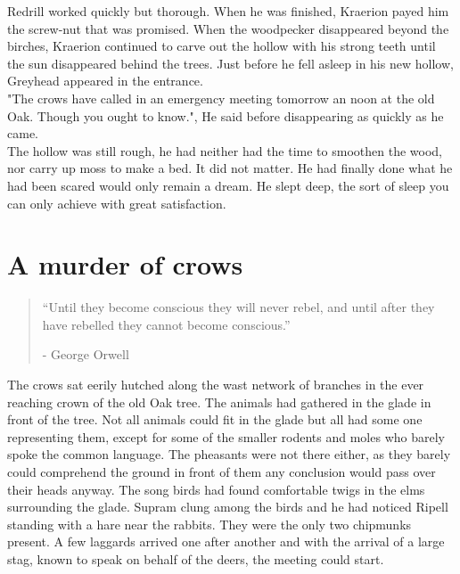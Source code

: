\documentclass[smalldemyvopaper,11pt,twoside,onecolumn,openright,extrafontsizes]{memoir}
\begin{document}
Redrill worked quickly but thorough. When he was finished, Kraerion payed him the screw-nut that was promised. When the woodpecker disappeared beyond the birches, Kraerion continued to carve out the hollow with his strong teeth until the sun disappeared behind the trees. Just before he fell asleep in his new hollow, Greyhead appeared in the entrance. \\

"The crows have called in an emergency meeting tomorrow an noon at the old Oak. Though you ought to know.", He said before disappearing as quickly as he came.\\

The hollow was still rough, he had neither had the time to smoothen the wood, nor carry up moss to make a bed. It did not matter. He had finally done what he had been scared would only remain a dream. He slept deep, the sort of sleep you can only achieve with great satisfaction.  

\chapter{A murder of crows}

\vspace{-1.3cm}
\begin{localsize}{10}
	\begin{quote}
		 “Until they become conscious they will never rebel, and until after they have rebelled they cannot become conscious.” 
		\begin{flushright}- George Orwell \end{flushright}
	\end{quote} 
\end{localsize}
\vspace{1cm}

The crows sat eerily hutched along the wast network of branches in the ever reaching crown of the old Oak tree. The animals had gathered in the glade in front of the tree. Not all animals could fit in the glade but all had some one representing them, except for some of the smaller rodents and moles who barely spoke the common language. The pheasants were not there either, as they barely could comprehend the ground in front of them any conclusion would pass over their heads anyway. The song birds had found comfortable twigs in the elms surrounding the glade. Supram clung among the birds and he had noticed Ripell standing with a hare near the rabbits. They were the only two chipmunks present. A few laggards arrived one after another and with the arrival of a large stag, known to speak on behalf of the deers, the meeting could start. \\
\end{document}
